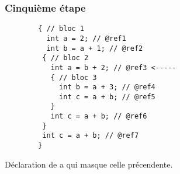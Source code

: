 \documentclass{../../res/univ-projet}
\begin{document}
    \subsubsection{Cinquième étape}
    \begin{multicols}{2}
        
        \begin{verbatim}
        { // bloc 1
          int a = 2; // @ref1
          int b = a + 1; // @ref2
         { // bloc 2 
           int a = b + 2; // @ref3 <-----
           { // bloc 3
             int b = a + 3; // @ref4
             int c = a + b; // @ref5
           }
           int c = a + b; // @ref6
         }
         int c = a + b; // @ref7
        }

        \end{verbatim}

      \columnbreak
        Déclaration de a qui masque celle précendente.
        
      \end{multicols}
\end{document}
